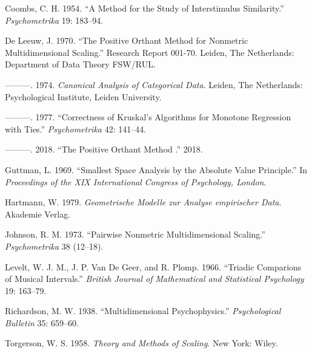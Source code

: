 \documentclass[
  12pt,
]{article}
\newlength{\cslhangindent}
\newenvironment{CSLReferences}[2] %
 {\begin{list}{}{%
  \setlength{\itemindent}{0pt}
  \setlength{\leftmargin}{0pt}
  \setlength{\parsep}{0pt}
  \ifodd #1
   \setlength{\leftmargin}{\cslhangindent}
   \setlength{\itemindent}{-1\cslhangindent}
  \fi
  \setlength{\itemsep}{#2\baselineskip}}}
 {\end{list}}
\begin{document}
\label{refs}
\begin{CSLReferences}{1}{0}
Coombs, C. H. 1954. {``A Method for the Study of Interstimulus Similarity.''} \emph{Psychometrika} 19: 183--94.

De Leeuw, J. 1970. {``The Positive Orthant Method for Nonmetric Multidimensional Scaling.''} Research Report 001-70. Leiden, The Netherlands: Department of Data Theory FSW/RUL.

---------. 1974. \emph{Canonical Analysis of Categorical Data}. Leiden, The Netherlands: Psychological Institute, Leiden University.

---------. 1977. {``Correctness of Kruskal's Algorithms for Monotone Regression with Ties.''} \emph{Psychometrika} 42: 141--44.

---------. 2018. {``{The Positive Orthant Method }.''} 2018.

Guttman, L. 1969. {``{Smallest Space Analysis by the Absolute Value Principle}.''} In \emph{{Proceedings of the XIX International Congress of Psychology, London}}.

Hartmann, W. 1979. \emph{{Geometrische Modelle zur Analyse empirischer Data}}. Akademie Verlag.

Johnson, R. M. 1973. {``{Pairwise Nonmetric Multidimensional Scaling}.''} \emph{Psychometrika} 38 (12--18).

Levelt, W. J. M., J. P. Van De Geer, and R. Plomp. 1966. {``{Triadic Comparions of Musical Intervals}.''} \emph{British Journal of Mathematical and Statistical Psychology} 19: 163--79.

Richardson, M. W. 1938. {``Multidimensional Psychophysics.''} \emph{Psychological Bulletin} 35: 659--60.

Torgerson, W. S. 1958. \emph{{Theory and Methods of Scaling}}. New York: Wiley.

\end{CSLReferences}
\end{document}
